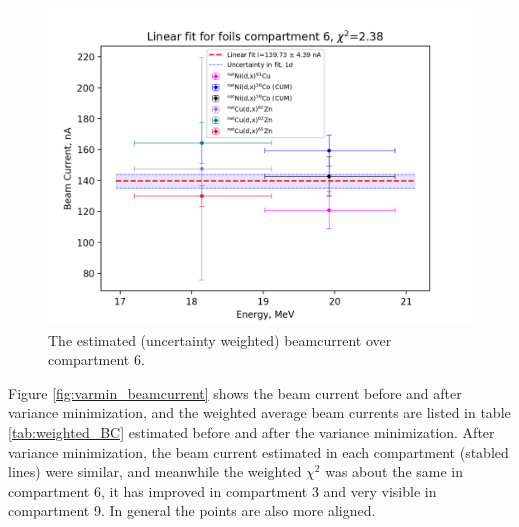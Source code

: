 \documentclass[a4paper,11pt,twoside]{book}
\begin{document}
\begin{figure}
    \centering
    \includegraphics{Analysis/Compartment_6.png}
    \caption{The estimated (uncertainty weighted) beamcurrent over compartment 6. }
    \label{fig:BC_comp6}
\end{figure}

Figure \ref{fig:varmin_beamcurrent} shows the beam current before and after variance minimization, and the weighted average beam currents are listed in table \ref{tab:weighted_BC} estimated before and after the variance minimization. After variance minimization, the beam current estimated in each compartment (stabled lines) were similar, and meanwhile the weighted $\chi^2$ was about the same in compartment 6, it has improved in compartment 3 and very visible in compartment 9. In general the points are also more aligned. 
\end{document}

